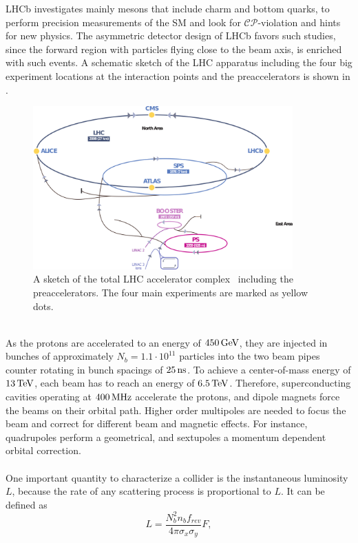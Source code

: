 LHCb investigates mainly mesons that include charm and bottom quarks, to perform precision measurements of the SM and look for $\mathcal{CP}$-violation and hints for new physics. The asymmetric detector design of LHCb favors such studies, since the forward region with particles flying close to the beam axis, is enriched with such events. A schematic sketch of the LHC apparatus including the four big experiment locations at the interaction points and the preaccelerators is shown in .
\begin{figure}[tbp]
 \centering
 \includegraphics[width=0.89\textwidth]{figures/general/LHC}
 \caption{A sketch of the total LHC accelerator complex~\cite{LHCPicture} including the preaccelerators. The four main experiments are marked as yellow dots.}
 \label{fig:LHC}
\end{figure}
\\As the protons are accelerated to an energy of $450\,\text{Ge\hspace{-.08em}V}$, they are injected in bunches of approximately $N_b=1.1\cdot10^{11}$ particles into the two beam pipes counter rotating in bunch spacings of $25\,\text{ns}$. To achieve a center-of-mass energy of $13\,\text{Te\hspace{-.08em}V}$, each beam has to reach an energy of $6.5\,\text{Te\hspace{-.08em}V}$. Therefore, superconducting cavities operating at $400\,\text{MHz}$ accelerate the protons, and dipole magnets force the beams on their orbital path. Higher order multipoles are needed to focus the beam and correct for different beam and magnetic effects. For instance, quadrupoles perform a geometrical, and sextupoles a momentum dependent orbital correction.\\\\
One important quantity to characterize a collider is the instantaneous luminosity $L$, because the rate of any scattering process is proportional to $L$. It can be defined as
\begin{equation}
 L = \frac{N_{b}^2 n_{b} f_{rev}} {4\pi \sigma_{x} \sigma_{y}}F,
\end{equation}
